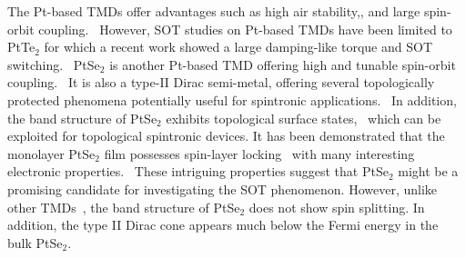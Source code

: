 \documentclass[journal=jacsat,manuscript=article]{achemso}
\begin{document}
The Pt-based TMDs offer advantages such as high air stability,\cite{zhao2017high}, and large spin-orbit coupling.~\cite{husain2020emergence} However, SOT studies on Pt-based TMDs have been limited to PtTe$_2$ for which a recent work showed a large damping-like torque and SOT switching.~\cite{xu2020high} PtSe$_2$ is another Pt-based TMD offering high and tunable spin-orbit coupling.~\cite{husain2020emergence} It is also a type-II Dirac semi-metal, offering several topologically protected phenomena potentially useful for spintronic applications.~\cite{zhang2017experimental} In addition, the band structure of PtSe$_2$ exhibits topological surface states,~\cite{bahramy2018ubiquitous} which can be exploited for topological spintronic devices. It has been demonstrated that the monolayer PtSe$_2$ film possesses spin-layer locking~\cite{yao2017direct} with many interesting electronic properties.~\cite{wang2015monolayer}
These intriguing properties suggest that PtSe$_{2}$ might be a promising candidate for investigating the SOT phenomenon. However, unlike other TMDs~\cite{bangar2022large}, the band structure of PtSe$_2$ does not show spin splitting. In addition, the type II Dirac cone appears much below the Fermi energy in the bulk PtSe$_2$.~\cite{zhang2017experimental} %
\end{document}

